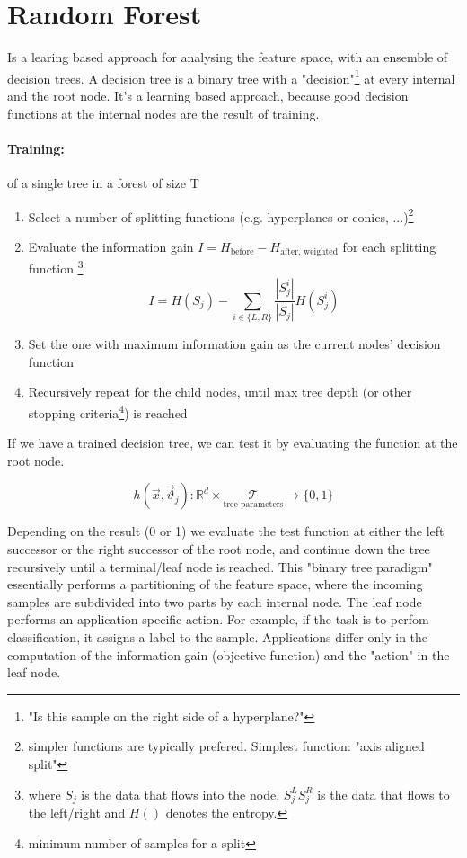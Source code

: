 
\section*{Random Forest}

Is a learing based approach for analysing the feature space, with an ensemble of decision trees. A decision tree is a binary tree with a "decision"\footnote{"Is this sample on the right side of a hyperplane?"} at every internal and the root node. It's a learning based approach, because good decision functions at the internal nodes are the result of training.


\paragraph{Training:} of a single tree in a forest of size T
\begin{enumerate}
  \item Select a number of splitting functions (e.g. hyperplanes or conics, ...)\footnote{simpler functions are typically prefered. Simplest function: "axis aligned split"}
  \item Evaluate the information gain $I = H_{\text{before}} - H_{\text{after, weighted}}$ for each splitting function \footnote{where \(S_j\) is the data that flows into the node, \(S^L_j S^R_j\) is the data that flows to the left/right and \(H()\) denotes the entropy.}
  \[I = H(S_j) - \sum_{i \in \{L,R\}} \frac{|S^i_j|}{|S_j|} H(S^i_j)\]
  \item Set the one with maximum information gain as the current nodes' decision function
  \item Recursively repeat for the child nodes, until max tree depth (or other stopping criteria\footnote{minimum number of samples for a split}) is reached
\end{enumerate}

If we have a trained decision tree, we can test it by evaluating the function at the root node.

\[h(\vec{x}, \vec{\vartheta}_j): \mathbb{R}^d \times \underset{\text{tree parameters}}{\mathcal{T}} \rightarrow \{0, 1\}\]

Depending on the result (0 or 1) we evaluate the test function at either the left successor or the right successor of the root node, and continue down the tree recursively until a terminal/leaf node is reached. This "binary tree paradigm" essentially performs a partitioning of the feature space, where the incoming samples are subdivided into two parts by each internal node.
The leaf node performs an application-specific action. For example, if the task is to perfom classification, it assigns a label to the sample. Applications differ only in the computation of the information gain (objective function) and the "action" in the leaf node.

